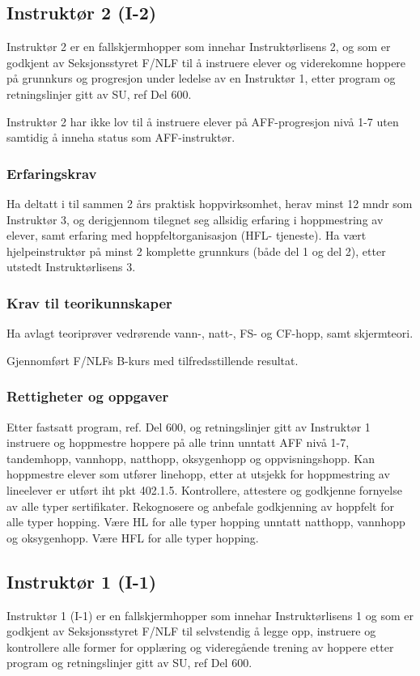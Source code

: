 \subsection{Instruktør 2 (I-2)}
Instruktør 2 er en fallskjermhopper som innehar Instruktørlisens 2, og som er godkjent av Seksjonsstyret F/NLF til å instruere elever og viderekomne hoppere på grunnkurs og progresjon under ledelse av en Instruktør 1, etter program og retningslinjer gitt av SU, ref Del 600.

Instruktør 2 har ikke lov til å instruere elever på AFF-progresjon nivå 1-7 uten samtidig å inneha status som AFF-instruktør.

\subsubsection{Erfaringskrav}
Ha deltatt i til sammen 2 års praktisk hoppvirksomhet, herav minst 12 mndr som Instruktør 3, og derigjennom tilegnet seg allsidig erfaring i hoppmestring av elever, samt erfaring med hoppfeltorganisasjon (HFL- tjeneste). Ha vært hjelpeinstruktør på minst 2 komplette grunnkurs (både del 1 og del 2), etter utstedt Instruktørlisens 3.

\subsubsection{Krav til teorikunnskaper}
Ha avlagt teoriprøver vedrørende vann-, natt-, FS- og CF-hopp, samt skjermteori.

Gjennomført F/NLFs B-kurs med tilfredsstillende resultat.

\subsubsection{Rettigheter og oppgaver}
Etter fastsatt program, ref. Del 600, og retningslinjer gitt av Instruktør 1 instruere og hoppmestre hoppere på alle trinn unntatt AFF nivå 1-7, tandemhopp, vannhopp, natthopp, oksygenhopp og oppvisningshopp. Kan hoppmestre elever som utfører linehopp, etter at utsjekk for hoppmestring av lineelever er utført iht pkt 402.1.5. Kontrollere, attestere og godkjenne fornyelse av alle typer sertifikater. Rekognosere og anbefale godkjenning av hoppfelt for alle typer hopping. Være HL for alle typer hopping unntatt natthopp, vannhopp og oksygenhopp. Være HFL for alle typer hopping.

\subsection{Instruktør 1 (I-1)}
Instruktør 1 (I-1) er en fallskjermhopper som innehar Instruktørlisens 1 og som er godkjent av Seksjonsstyret F/NLF til selvstendig å legge opp, instruere og kontrollere alle former for opplæring og videregående trening av hoppere etter program og retningslinjer gitt av SU, ref Del 600.

